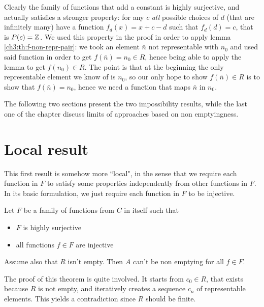 Clearly the family of functions that add a constant is highly surjective, and actually satisfies a stronger property: for any $c$ \textit{all} possible choices of $d$ (that are infinitely many) have a function $f_d(x) = x + c - d$ such that $f_d(d) = c$, that is $P(c) = \mathbb{Z}$. We used this property in the proof in order to apply lemma \ref{ch3:th:f-non-repr-pair}: we took an element $\bar{n}$ not representable with $n_0$ and used said function in order to get $f(\bar{n}) = n_0 \in R$, hence being able to apply the lemma to get $f(n_0) \in R$. The point is that at the beginning the only representable element we know of is $n_0$, so our only hope to show $f(\bar{n}) \in R$ is to show that $f(\bar{n}) = n_0$, hence we need a function that maps $\bar{n}$ in $n_0$.

The following two sections present the two impossibility results, while the last one of the chapter discuss limits of approaches based on non emptyingness.

\section{Local result}
This first result is somehow more ``local", in the sense that we require each function in $F$ to satisfy some properties independently from other functions in $F$. In its basic formulation, we just require each function in $F$ to be injective.

\begin{theorem}\label{ch4:th:non-empt-res-local-basic}
	Let $F$ be a family of functions from $C$ in itself such that
	\begin{itemize}
		\item $F$ is highly surjective
		\item all functions $f \in F$ are injective
	\end{itemize}
	Assume also that $R$ isn't empty. Then $A$ can't be non emptying for all $f \in F$.
\end{theorem}
The proof of this theorem is quite involved. It starts from $c_0 \in R$, that exists because $R$ is not empty, and iteratively creates a sequence $c_n$ of representable elements. This yields a contradiction since $R$ should be finite.

